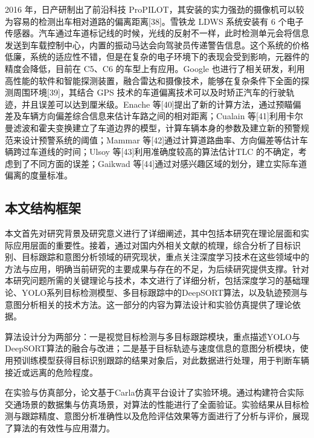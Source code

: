   2016 年，日产研制出了前沿科技 ProPILOT，其安装的实力强劲的摄像机可以较为容易的检测出车相对道路的偏离距离[38]。雪铁龙 LDWS 系统安装有 6 个电子传感器。汽车通过车道标记线的时候，光线的反射不一样，此时检测单元会将信息发送到车载控制中心，内置的振动马达会向驾驶员传递警告信息。这个系统的价格低廉，系统的适应性不错，但是在复杂的电子环境下的表现会受到影响，元器件的精度会降低，目前在 C5、C6 的车型上有应用。Google 也进行了相关研发，利用高性能的软件和智能探测装置，融合雷达和摄像技术，能够在复杂条件下全面的探测周围环境[39]，其结合 GPS 技术的车道偏离技术可以及时矫正汽车的行驶轨迹，并且误差可以达到厘米级。Enache 等[40]提出了新的计算方法，通过预瞄偏差及车辆方向偏差综合信息来估计车路之间的相对距离；Cualain 等[41]利用卡尔曼滤波和霍夫变换建立了车道边界的模型，计算车辆本身的参数及建立新的预警规范来设计预警系统的阈值；Mammar 等[42]通过计算道路曲率、方向偏差等估计车辆跨过车道线的时间；Ulsoy 等[43]利用准确度较高的算法估计TLC 的不确定，考虑到了不同方面的误差；Gaikwad 等[44]通过对感兴趣区域的划分，建立实际车道偏离的度量标准。

\subsection{本文结构框架}

本文首先对研究背景及研究意义进行了详细阐述，其中包括本研究在理论层面和实际应用层面的重要性。接着，通过对国内外相关文献的梳理，综合分析了目标识别、目标跟踪和意图分析领域的研究现状，重点关注深度学习技术在这些领域中的方法与应用，明确当前研究的主要成果与存在的不足，为后续研究提供支撑。针对本研究问题所需的关键理论与技术，本文进行了详细分析，包括深度学习的基础理论、YOLO系列目标检测模型、多目标跟踪中的DeepSORT算法，以及轨迹预测与意图分析相关的技术方法。这一部分的内容为算法设计和实验仿真提供了理论依据。

算法设计分为两部分：一是视觉目标检测与多目标跟踪模块，重点描述YOLO与DeepSORT算法的融合与改进；二是基于目标轨迹与速度信息的意图分析模块，使用预训练模型获得目标识别跟踪的结果对象后，对此数据进行处理，用于判断车辆接近或远离的危险程度。

在实验与仿真部分，论文基于Carla仿真平台设计了实验环境。通过构建符合实际交通场景的数据集与仿真场景，对算法的性能进行了全面验证。实验结果从目标检测与跟踪精度、意图分析准确性以及危险评估效果等方面进行了分析与评价，展现了算法的有效性与应用潜力。

